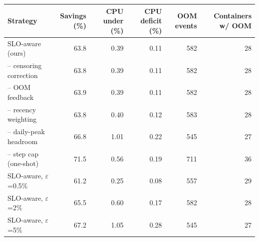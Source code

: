 \begin{tabular}{lrrrrr}\toprule
Strategy & Savings (\%) & CPU under (\%) & CPU deficit (\%) & OOM events & Containers w/ OOM \\\midrule
SLO-aware (ours) & 63.8 & 0.39 & 0.11 & 582 & 28 \\
-- censoring correction & 63.8 & 0.39 & 0.11 & 582 & 28 \\
-- OOM feedback & 63.9 & 0.39 & 0.11 & 582 & 28 \\
-- recency weighting & 63.8 & 0.40 & 0.12 & 583 & 28 \\
-- daily-peak headroom & 66.8 & 1.01 & 0.22 & 545 & 27 \\
-- step cap (one-shot) & 71.5 & 0.56 & 0.19 & 711 & 36 \\
SLO-aware, $\varepsilon$=0.5\% & 61.2 & 0.25 & 0.08 & 557 & 29 \\
SLO-aware, $\varepsilon$=2\% & 65.5 & 0.60 & 0.17 & 582 & 28 \\
SLO-aware, $\varepsilon$=5\% & 67.2 & 1.05 & 0.28 & 545 & 27 \\
\bottomrule\end{tabular}
